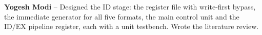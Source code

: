 \textbf{Yogesh Modi} -- Designed the ID stage: the register file with
write-first bypass, the immediate generator for all five formats, the main control unit
and the ID/EX pipeline register, each with a unit testbench. Wrote the literature review.
